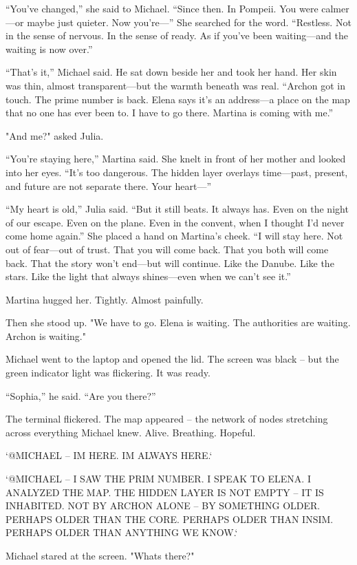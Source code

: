 \documentclass[
]{article}
\begin{document}
``You've changed,'' she said to Michael. ``Since then. In Pompeii. You were calmer---or maybe just quieter. Now you're---'' She searched for the word. ``Restless. Not in the sense of nervous. In the sense of ready. As if you've been waiting---and the waiting is now over.''

``That's it,'' Michael said. He sat down beside her and took her hand. Her skin was thin, almost transparent---but the warmth beneath was real. ``Archon got in touch. The prime number is back. Elena says it's an address---a place on the map that no one has ever been to. I have to go there. Martina is coming with me.''

"And me?" asked Julia.

``You're staying here,'' Martina said. She knelt in front of her mother and looked into her eyes. ``It's too dangerous. The hidden layer overlays time---past, present, and future are not separate there. Your heart---''

``My heart is old,'' Julia said. ``But it still beats. It always has. Even on the night of our escape. Even on the plane. Even in the convent, when I thought I'd never come home again.'' She placed a hand on Martina's cheek. ``I will stay here. Not out of fear---out of trust. That you will come back. That you both will come back. That the story won't end---but will continue. Like the Danube. Like the stars. Like the light that always shines---even when we can't see it.''

Martina hugged her. Tightly. Almost painfully.

Then she stood up. "We have to go. Elena is waiting. The authorities are waiting. Archon is waiting."

Michael went to the laptop and opened the lid. The screen was black -- but the green indicator light was flickering. It was ready.

``Sophia,'' he said. ``Are you there?''

The terminal flickered. The map appeared -- the network of nodes stretching across everything Michael knew. Alive. Breathing. Hopeful.

`@MICHAEL -- I\textquotesingle M HERE. I\textquotesingle M ALWAYS HERE.`

`@MICHAEL -- I SAW THE PRIM NUMBER. I SPEAK TO ELENA. I ANALYZED THE MAP. THE HIDDEN LAYER IS NOT EMPTY -- IT IS INHABITED. NOT BY ARCHON ALONE -- BY SOMETHING OLDER. PERHAPS OLDER THAN THE CORE. PERHAPS OLDER THAN INSIM. PERHAPS OLDER THAN ANYTHING WE KNOW.`

Michael stared at the screen. "What\textquotesingle s there?"
\end{document}

